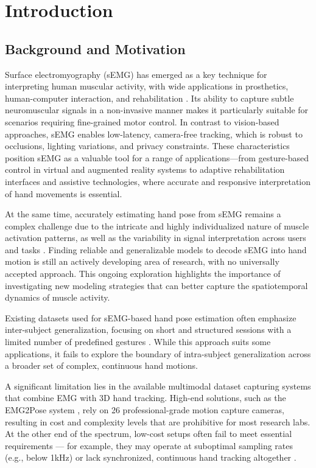 \chapter{Introduction}
\label{chap:intro}

\section{Background and Motivation}

Surface electromyography (sEMG) has emerged as a key technique for interpreting human muscular activity, with wide applications in prosthetics, human-computer interaction, and rehabilitation \cite{zheng2022surface, simao2019review}. Its ability to capture subtle neuromuscular signals in a non-invasive manner makes it particularly suitable for scenarios requiring fine-grained motor control. In contrast to vision-based approaches, sEMG enables low-latency, camera-free tracking, which is robust to occlusions, lighting variations, and privacy constraints. These characteristics position sEMG as a valuable tool for a range of applications—from gesture-based control in virtual and augmented reality systems to adaptive rehabilitation interfaces and assistive technologies, where accurate and responsive interpretation of hand movements is essential.

At the same time, accurately estimating hand pose from sEMG remains a complex challenge due to the intricate and highly individualized nature of muscle activation patterns, as well as the variability in signal interpretation across users and tasks \cite{farago2022review, zia2018multiday}. Finding reliable and generalizable models to decode sEMG into hand motion is still an actively developing area of research, with no universally accepted approach. This ongoing exploration highlights the importance of investigating new modeling strategies that can better capture the spatiotemporal dynamics of muscle activity.

Existing datasets used for sEMG-based hand pose estimation often emphasize inter-subject generalization, focusing on short and structured sessions with a limited number of predefined gestures \cite{salter2024emg2pose}. While this approach suits some applications, it fails to explore the boundary of intra-subject generalization across a broader set of complex, continuous hand motions.

A significant limitation lies in the available multimodal dataset capturing systems that combine EMG with 3D hand tracking. High-end solutions, such as the EMG2Pose system \cite{salter2024emg2pose}, rely on 26 professional-grade motion capture cameras, resulting in cost and complexity levels that are prohibitive for most research labs. At the other end of the spectrum, low-cost setups often fail to meet essential requirements — for example, they may operate at suboptimal sampling rates (e.g., below 1kHz) or lack synchronized, continuous hand tracking altogether \cite{nasri2020semg}.

